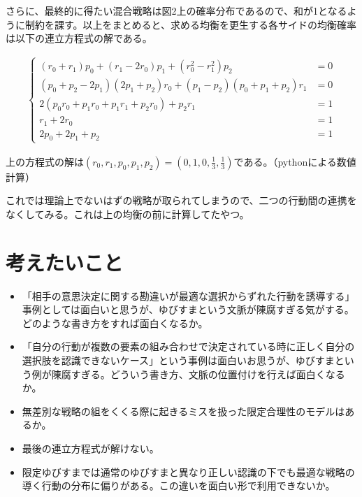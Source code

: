 \documentclass{jsarticle}
\begin{document}
さらに、最終的に得たい混合戦略は図2上の確率分布であるので、和が1となるように制約を課す。以上をまとめると、求める均衡を更生する各サイドの均衡確率は以下の連立方程式の解である。

\begin{align*}
	\begin{cases}
		(r_0 + r_1)p_0 + (r_1 - 2r_0)p_1 + (r_0^2 - r_1^2)p_2&= 0\\
		(p_0 + p_2 - 2p_1)(2p_1 + p_2)r_0 + (p_1 - p_2)(p_0 + p_1 + p_2)r_1 &= 0\\
		2(p_0r_0 + p_1r_0 + p_1r_1 + p_2r_0) + p_2r_1 &= 1\\
		r_1 + 2r_0 &= 1\\
		2p_0 + 2p_1 + p_2 &= 1
	\end{cases}
\end{align*}

上の方程式の解は$(r_0, r_1,p_0, p_1, p_2) = (0, 1, 0, \frac{1}{3}, \frac{1}{3})$である。（pythonによる数値計算）

これでは理論上でないはずの戦略が取られてしまうので、二つの行動間の連携をなくしてみる。これは上の均衡の前に計算してたやつ。

\section{考えたいこと}
\begin{itemize}
	\item 「相手の意思決定に関する勘違いが最適な選択からずれた行動を誘導する」事例としては面白いと思うが、ゆびすまという文脈が陳腐すぎる気がする。どのような書き方をすれば面白くなるか。
	\item 「自分の行動が複数の要素の組み合わせで決定されている時に正しく自分の選択肢を認識できないケース」という事例は面白いお思うが、ゆびすまという例が陳腐すぎる。どういう書き方、文脈の位置付けを行えば面白くなるか。
	\item 無差別な戦略の組をくくる際に起きるミスを扱った限定合理性のモデルはあるか。
	\item 最後の連立方程式が解けない。
	\item 限定ゆびすまでは通常のゆびすまと異なり正しい認識の下でも最適な戦略の導く行動の分布に偏りがある。この違いを面白い形で利用できないか。
\end{itemize}
\end{document}
